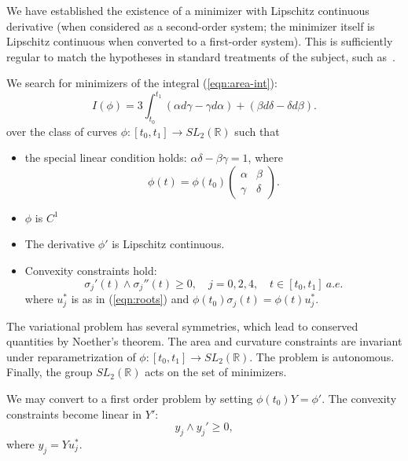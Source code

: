 \documentclass[11pt]{amsart}
\newcommand{\ring}[1]{\mathbb{#1}}
\begin{document}
We have established the existence of a minimizer with Lipschitz
continuous derivative (when considered as a second-order system; the
minimizer itself is Lipschitz continuous when converted to a
first-order system).  This is sufficiently regular to match the
hypotheses in standard treatments of the subject, such as~\cite{Po}.


We search for minimizers of the integral (\ref{eqn:area-int}):
\begin{equation}
I(\phi) = 3\int_{t_0}^{t_1} (\alpha d\gamma - \gamma d\alpha) + (\beta d\delta - \delta d\beta).
\end{equation}
over the class of curves $\phi:[t_0,t_1]\to SL_2(\ring{R})$ such that 
\begin{itemize}
\item the special linear condition holds: $\alpha\delta-\beta\gamma=1$, where
 $$\phi(t) = \phi(t_0)\left(\begin{matrix}\alpha&\beta\\\gamma&\delta\end{matrix}\right).$$
\item $\phi$ is $C^1$
\item The derivative $\phi'$ is Lipschitz continuous.
\item Convexity constraints hold:
  $$\sigma_j'(t) \land \sigma_j''(t) \ge 0,\quad j=0,2,4,\quad t\in[t_0,t_1]~a.e.$$
where $u^*_j$ is as in (\ref{eqn:roots}) and $\phi(t_0)\sigma_j(t) = \phi(t) u^*_j$.
\end{itemize}


The variational problem has several symmetries, which lead to
conserved quantities by Noether's theorem.  The area and curvature
constraints are invariant under reparametrization of
$\phi:[t_0,t_1]\to SL_2(\ring{R})$.  The problem is autonomous.
Finally, the group $SL_2(\ring{R})$ acts on the set of minimizers.

We may convert to a first order problem by setting $\phi(t_0)Y = \phi'$.  The convexity
constraints become linear in $Y'$:
\begin{equation}\label{eqn:curvature}
  y_j \land y_j' \ge 0,
\end{equation}
where $y_j = Y u^*_j$.
\end{document}
